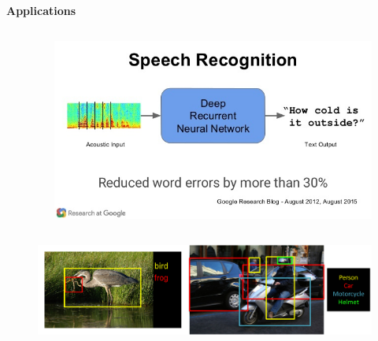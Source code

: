 \documentclass[xcolor=dvipsnames]{beamer}
\begin{document}
\begin{frame}{\bf Applications}
\begin{columns}
\begin{column}{0.33\textwidth}
    \end{column}


    \begin{column}{0.33\textwidth}  %

        \begin{figure}
        \includegraphics[scale=0.15]{../../pictures/speach_recognition.jpg}
        \end{figure}

    \end{column}

\end{columns}


\begin{figure}
\includegraphics[scale=0.2]{../../pictures/image_recognition.png}
\end{figure}


\end{frame}
\end{document}
